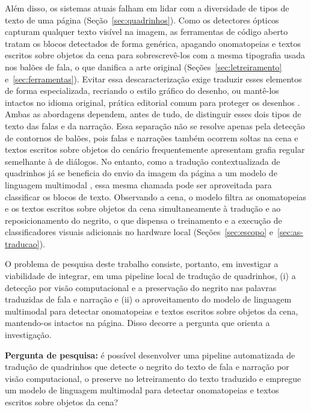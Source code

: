 \documentclass[
    12pt,
    openright,
    oneside,
    a4paper,
    chapter=TITLE,
    section=TITLE,
    english,
    brazilian,
    brazil
]{abntex2}
\begin{document}
Além disso, os sistemas atuais falham em lidar com a diversidade de tipos de texto de uma página (Seção~\ref{sec:quadrinhos}). Como os detectores ópticos capturam qualquer texto visível na imagem, as ferramentas de código aberto tratam os blocos detectados de forma genérica, apagando onomatopeias e textos escritos sobre objetos da cena para sobrescrevê-los com a mesma tipografia usada nos balões de fala, o que danifica a arte original (Seções~\ref{sec:letreiramento} e~\ref{sec:ferramentas}). Evitar essa descaracterização exige traduzir esses elementos de forma especializada, recriando o estilo gráfico do desenho, ou mantê-los intactos no idioma original, prática editorial comum para proteger os desenhos \cite{assis2016especificidades, leitao2010estrategias}. Ambas as abordagens dependem, antes de tudo, de distinguir esses dois tipos de texto das falas e da narração. Essa separação não se resolve apenas pela detecção de contornos de balões, pois falas e narrações também ocorrem soltas na cena e textos escritos sobre objetos do cenário frequentemente apresentam grafia regular semelhante à de diálogos. No entanto, como a tradução contextualizada de quadrinhos já se beneficia do envio da imagem da página a um modelo de linguagem multimodal \cite{lippmann-etal-2025-context}, essa mesma chamada pode ser aproveitada para classificar os blocos de texto. Observando a cena, o modelo filtra as onomatopeias e os textos escritos sobre objetos da cena simultaneamente à tradução e ao reposicionamento do negrito, o que dispensa o treinamento e a execução de classificadores visuais adicionais no hardware local (Seções~\ref{sec:escopo} e~\ref{sec:as-traducao}).

O problema de pesquisa deste trabalho consiste, portanto, em investigar a viabilidade de integrar, em uma pipeline local de tradução de quadrinhos, (i) a detecção por visão computacional e a preservação do negrito nas palavras traduzidas de fala e narração e (ii) o aproveitamento do modelo de linguagem multimodal para detectar onomatopeias e textos escritos sobre objetos da cena, mantendo-os intactos na página. Disso decorre a pergunta que orienta a investigação.

\textbf{Pergunta de pesquisa:} é possível desenvolver uma pipeline automatizada de tradução de quadrinhos que detecte o negrito do texto de fala e narração por visão computacional, o preserve no letreiramento do texto traduzido e empregue um modelo de linguagem multimodal para detectar onomatopeias e textos escritos sobre objetos da cena?
\end{document}
